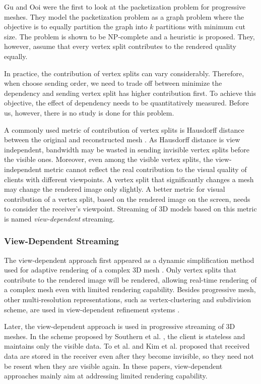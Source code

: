 \documentclass[11pt, a4paper]{report}
\begin{document}
    Gu and Ooi \cite{Gu:Packetization} were the first to look at
    the packetization problem for progressive meshes.  They model
    the packetization problem as a graph problem where the objective
    is to equally partition the graph into $k$ partitions with minimum
    cut size.  The problem is shown to be NP-complete and a heuristic
    is proposed.  They, however, assume that every vertex split contributes 
    to the rendered quality equally.
    
    In practice, the contribution of vertex splits can
    vary considerably. Therefore, when choose sending order, we
    need to trade off between minimize the dependency and sending 
    vertex split has higher contribution first. To achieve this objective,
    the effect of dependency needs to be quantitatively measured.
    Before us, however, there is no study is done for this problem.

    A commonly used metric of contribution of vertex splits is 
    Hausdorff distance between the original and reconstructed mesh \cite{cignoni98metro}.
    As Hausdorff distance is view independent, 
    bandwidth may be wasted in sending invisible vertex splits
    before the visible ones. Moreover, even among the visible vertex splits,
    the view-independent metric cannot reflect the real contribution to the visual quality of
    clients with different viewpoints. A vertex split that significantly
    changes a mesh may change the rendered image 
    only slightly.  A better metric for visual contribution of a vertex split,
    based on the rendered image on the screen, 
    needs to consider the receiver's viewpoint.
    Streaming of 3D models based on this metric is named \emph{view-dependent} streaming.

    \subsubsection{View-Dependent Streaming}
    The view-dependent approach first appeared as 
    a dynamic simplification method used for adaptive rendering of a complex 3D mesh
    \cite{258843, 258847}. Only vertex splits that contribute to the rendered
    image will be rendered, allowing real-time rendering of a complex mesh
    even with limited rendering capability.
    Besides progressive mesh, other multi-resolution representations, 
    such as vertex-clustering  and subdivision scheme,
    are used in view-dependent refinement systems \cite{245627, efficient:Alliez,602344}.

    Later, the view-dependent approach is used in progressive 
	streaming of 3D meshes.     
    In the scheme proposed by Southern et al. \cite{363375},  the client is stateless and
    maintains only the visible data. 
    To et al. \cite{To1999}
    and Kim et al. \cite{kim:view} proposed that received data are stored
    in the receiver even after they become invisible, 
    so they need not be resent when they are visible again. 
    In these papers, view-dependent approaches mainly aim at addressing
    limited rendering capability. 
    
\end{document}
